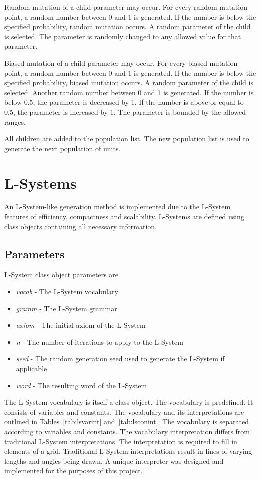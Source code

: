 Random mutation of a child parameter may occur. For every random mutation point, a random number between 0 and 1 is generated. If the number is below the specified probability, random mutation occurs. A random parameter of the child is selected. The parameter is randomly changed to any allowed value for that parameter.

Biased mutation of a child parameter may occur. For every biased mutation point, a random number between 0 and 1 is generated. If the number is below the specified probability, biased mutation occurs. A random parameter of the child is selected. Another random number between 0 and 1 is generated. If the number is below 0.5, the parameter is decreased by 1. If the number is above or equal to 0.5, the parameter is increased by 1. The parameter is bounded by the allowed ranges.

All children are added to the population list. The new population list is used to generate the next population of units.

\section{L-Systems}
\label{sec:LS}

An L-System-like generation method is implemented due to the L-System features of efficiency, compactness and scalability. L-Systems are defined using class objects containing all necessary information.

\subsection{Parameters}

L-System class object parameters are

\begin{itemize}
	\item \textit{vocab} - The L-System vocabulary
	\item \textit{gramm} - The L-System grammar
	\item \textit{axiom} - The initial axiom of the L-System
	\item \textit{n} - The number of iterations to apply to the L-System
	\item \textit{seed} - The random generation seed used to generate the L-System if applicable
	\item \textit{word} - The resulting word of the L-System
\end{itemize}

The L-System vocabulary is itself a class object. The vocabulary is predefined. It consists of variables and constants. The vocabulary and its interpretations are outlined in Tables~\ref{tab:lsvarint} and~\ref{tab:lsconint}. The vocabulary is separated according to variables and constants. The vocabulary interpretation differs from traditional L-System interpretations. The interpretation is required to fill in elements of a grid. Traditional L-System interpretations result in lines of varying lengths and angles being drawn. A unique interpreter was designed and implemented for the purposes of this project.

